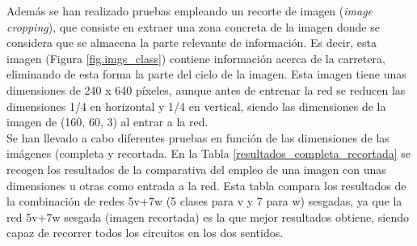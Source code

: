 Además se han realizado pruebas empleando un recorte de imagen (\textit{image cropping}), que consiste en extraer una zona concreta de la imagen donde se considera que se almacena la parte relevante de información. Es decir, esta imagen (Figura \ref{fig.imgs_class}) contiene información acerca de la carretera, eliminando de esta forma la parte del cielo de la imagen. Esta imagen tiene unas dimensiones de 240 x 640 píxeles, aunque antes de entrenar la red se reducen las dimensiones 1/4 en horizontal y 1/4 en vertical, siendo las dimensiones de la imagen de (160, 60, 3) al entrar a la red.\\


Se han llevado a cabo diferentes pruebas en función de las dimensiones de las imágenes (completa y recortada. En la Tabla \ref{resultados_completa_recortada} se recogen los resultados de la comparativa del empleo de una imagen con unas dimensiones u otras como entrada a la red. Esta tabla compara los resultados de la combinación de redes 5v+7w (5 clases para v y 7 para w) sesgadas, ya que la red 5v+7w sesgada (imagen recortada) es la que mejor resultados obtiene, siendo capaz de recorrer todos los circuitos en los dos sentidos.\\


